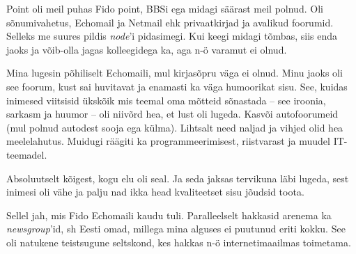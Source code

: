 
Point oli meil puhas Fido point, BBSi ega midagi säärast meil polnud. 
Oli sõnumivahetus, Echomail ja Netmail ehk 
privaatkirjad ja avalikud foorumid. Selleks me 
suures pildis \emph{node}'i pidasimegi. Kui keegi midagi tõmbas, siis enda jaoks ja võib-olla jagas kolleegidega ka, aga n-ö varamut ei olnud.


Mina lugesin põhiliselt Echomaili, mul kirjasõpru väga ei olnud. Minu 
jaoks oli see foorum, kust sai huvitavat ja enamasti ka väga 
humoorikat sisu. See, kuidas inimesed viitsisid ükskõik mis teemal 
oma mõtteid sõnastada – see iroonia, sarkasm ja huumor – oli niivõrd hea, et lust oli 
lugeda. Kasvõi autofoorumeid (mul polnud autodest sooja ega külma). Lihtsalt need naljad ja vihjed olid hea 
meelelahutus. Muidugi räägiti ka programmeerimisest, riistvarast ja 
muudel IT-teemadel.


Absoluutselt kõigest, kogu elu oli seal. Ja seda jaksas tervikuna 
läbi lugeda, sest inimesi oli vähe ja palju nad ikka head kvaliteetset sisu 
jõudsid toota.


Sellel jah, mis Fido Echomaili kaudu tuli. Paralleelselt 
hakkasid arenema ka \emph{newsgroup}'id, sh Eesti omad, millega mina 
alguses ei puutunud eriti kokku. See oli natukene teistsugune seltskond, kes hakkas n-ö internetimaailmas toimetama. 


